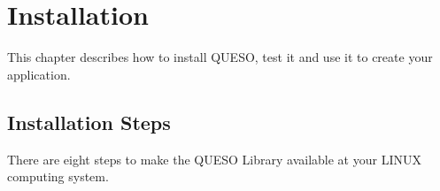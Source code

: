 \chapter{Installation}\label{ch-install}
\thispagestyle{headings}

This chapter describes how to install QUESO, test it and use it to create your application.

  

        
\section{Installation Steps}

There are eight steps to make the QUESO Library available at your LINUX computing system.

